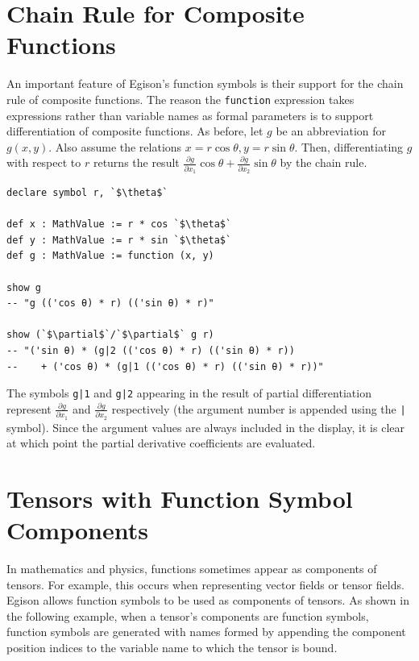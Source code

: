 \section{Chain Rule for Composite Functions}\label{funcsym-chain}

An important feature of Egison's function symbols is their support for the chain rule of composite functions.
The reason the \lstinline{function} expression takes expressions rather than variable names as formal parameters is to support differentiation of composite functions.
As before, let $g$ be an abbreviation for $g(x,y)$.
Also assume the relations $x=r \cos \theta, y= r \sin \theta$.
Then, differentiating $g$ with respect to $r$ returns the result $\frac{\partial g}{\partial x_1} \cos \theta + \frac{\partial g}{\partial x_2} \sin \theta$ by the chain rule.

\begin{lstlisting}[language=egison,numbers=none]
declare symbol r, `$\theta$`

def x : MathValue := r * cos `$\theta$`
def y : MathValue := r * sin `$\theta$`
def g : MathValue := function (x, y)

show g
-- "g (('cos θ) * r) (('sin θ) * r)"

show (`$\partial$`/`$\partial$` g r)
-- "('sin θ) * (g|2 (('cos θ) * r) (('sin θ) * r))
--    + ('cos θ) * (g|1 (('cos θ) * r) (('sin θ) * r))"
\end{lstlisting}

The symbols \verb!g|1! and \verb!g|2! appearing in the result of partial differentiation represent $\frac{\partial g}{\partial x_1}$ and $\frac{\partial g}{\partial x_2}$ respectively (the argument number is appended using the \verb!|! symbol).
Since the argument values are always included in the display, it is clear at which point the partial derivative coefficients are evaluated.

\section{Tensors with Function Symbol Components}\label{funcsym-tensor}

In mathematics and physics, functions sometimes appear as components of tensors.
For example, this occurs when representing vector fields or tensor fields.
Egison allows function symbols to be used as components of tensors.
As shown in the following example, when a tensor's components are function symbols, function symbols are generated with names formed by appending the component position indices to the variable name to which the tensor is bound.

